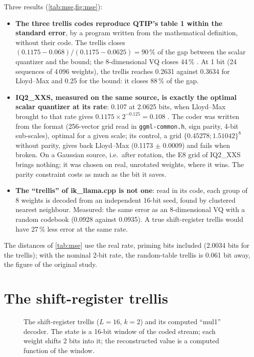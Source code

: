Three results (\cref{tab:mse,fig:mse}):
\begin{itemize}
\item \textbf{The three trellis codes reproduce QTIP's table 1 within the standard error}, by a program written from the mathematical definition, without their code. The trellis closes $(0.1175 - 0.068)/(0.1175 - 0.0625) = 90\,\%$ of the gap between the scalar quantizer and the bound; the 8-dimensional VQ closes 44\,\% \calc. At 1 bit (24 sequences of 4\,096 weights), the trellis reaches 0.2631 against 0.3634 for Lloyd--Max and 0.25 for the bound: it closes 88\,\% of the gap.
\item \textbf{IQ2\_XXS, measured on the same source, is exactly the optimal scalar quantizer at its rate}: 0.107 at 2.0625 bits, when Lloyd--Max brought to that rate gives $0.1175 \times 2^{-0.125} = 0.108$ \calc. The coder was written from the format (256-vector grid read in \texttt{ggml-common.h}, sign parity, 4-bit sub-scales), optimal for a given scale; its control, a grid $\{0.45278 ; 1.51042\}^8$ without parity, gives back Lloyd--Max (0.1173 $\pm$ 0.0009) and fails when broken. On a Gaussian source, i.e.\ after rotation, the E8 grid of IQ2\_XXS brings nothing; it was chosen on real, unrotated weights, where it wins. The parity constraint costs as much as the bit it saves.
\item \textbf{The \enquote{trellis} of ik\_llama.cpp is not one}: read in its code, each group of 8 weights is decoded from an independent 16-bit seed, found by clustered nearest neighbour. Measured: the same error as an 8-dimensional VQ with a random codebook (0.0928 against 0.0935). A true shift-register trellis would have 27\,\% less error at the same rate.
\end{itemize}
The distances of \cref{tab:mse} use the real rate, priming bits included (2.0034 bits for the trellis); with the nominal 2-bit rate, the random-table trellis is 0.061 bit away, the figure of the original study.

\section{The shift-register trellis}\label{sec:treillis}

\begin{figure}[ht]
\centering
\SchemaTreillis
\caption[The shift-register trellis and its computed decoder]{The shift-register trellis ($L = 16$, $k = 2$) and its computed \enquote{mul1} decoder. The state is a 16-bit window of the coded stream; each weight shifts 2 bits into it; the reconstructed value is a computed function of the window.}
\label{fig:treillis}
\end{figure}


